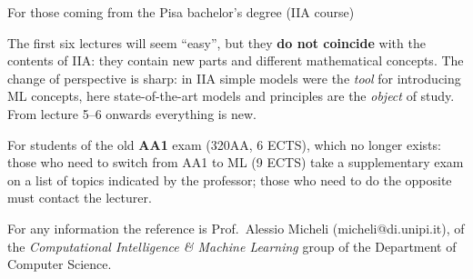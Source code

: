 \begin{boxwarning}{For those coming from the Pisa bachelor's degree (IIA course)}

The first six lectures will seem ``easy'', but they \textbf{do not
coincide} with the contents of IIA: they contain new parts and
different mathematical concepts. The change of perspective is sharp: in
IIA simple models were the \emph{tool} for introducing ML concepts,
here state-of-the-art models and principles are the \emph{object} of
study. From lecture 5--6 onwards everything is new.

\end{boxwarning}

For students of the old \textbf{AA1} exam (320AA, 6 ECTS), which no
longer exists: those who need to switch from AA1 to ML (9 ECTS) take a
supplementary exam on a list of topics indicated by the professor;
those who need to do the opposite must contact the lecturer.

For any information the reference is Prof.~Alessio Micheli
(micheli@di.unipi.it), of the \emph{Computational Intelligence \&
Machine Learning} group of the Department of Computer Science.

